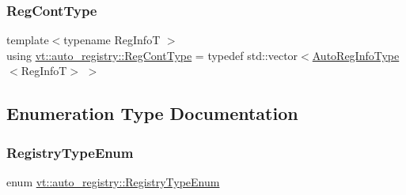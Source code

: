 \subsubsection{\texorpdfstring{Reg\+Cont\+Type}{RegContType}}
{\footnotesize\ttfamily template$<$typename Reg\+InfoT $>$ \\
using \hyperlink{namespacevt_1_1auto__registry_a988a4943e4c8fe82b56f5b13bddceb2b}{vt\+::auto\+\_\+registry\+::\+Reg\+Cont\+Type} = typedef std\+::vector$<$\hyperlink{namespacevt_1_1auto__registry_af3f78826dd69454aeb914a3c7bec0a52}{Auto\+Reg\+Info\+Type}$<$Reg\+InfoT$>$ $>$}



\subsection{Enumeration Type Documentation}
\mbox{\label{namespacevt_1_1auto__registry_a9f369ca2b484130b396729e2ddf05241}} 
\subsubsection{\texorpdfstring{Registry\+Type\+Enum}{RegistryTypeEnum}}
{\footnotesize\ttfamily enum \hyperlink{namespacevt_1_1auto__registry_a9f369ca2b484130b396729e2ddf05241}{vt\+::auto\+\_\+registry\+::\+Registry\+Type\+Enum}\hspace{0.3cm}{\ttfamily [strong]}}

